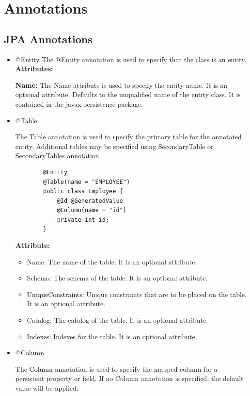 \documentclass{report}
\begin{document}
	\section{Annotations}
	\subsection{JPA Annotations}
	\begin{itemize}
		\item @Entity
		The @Entity annotation is used to specify that the class is an entity.
		\newline
		{\Large \textbf{Attributes:}}
		
		\textbf{Name:} The Name attribute is used to specify the entity name. It is an optional attribute. Defaults to the unqualified name of the entity class. It is contained in the javax.persistence package.
		\item @Table
		
		\par 
		The Table annotation is used to specify the primary table for the annotated entity. Additional tables may be specified using SecondaryTable or SecondaryTables annotation.
				
	\begin{lstlisting}
		@Entity
		@Table(name = "EMPLOYEE")
		public class Employee {
			@Id @GeneratedValue
			@Column(name = "id")
			private int id;
		}

	\end{lstlisting}
		{\large {\textbf{Attribute:}}}
		\begin{itemize}
			\item Name: The name of the table. It is an optional attribute.
			\item Schema: The schema of the table. It is an optional attribute.
			\item UniqueConstraints: Unique constraints that are to be placed on the table. It is an optional attribute.
			\item Catalog: The catalog of the table. It is an optional attribute.
			\item Indexes: Indexes for the table. It is an optional attribute.
		\end{itemize}
		\item @Column
			\par The Column annotation is used to specify the mapped column for a persistent property or field. If no Column annotation is specified, the default value will be applied.
			

\end{itemize}
\end{document}
